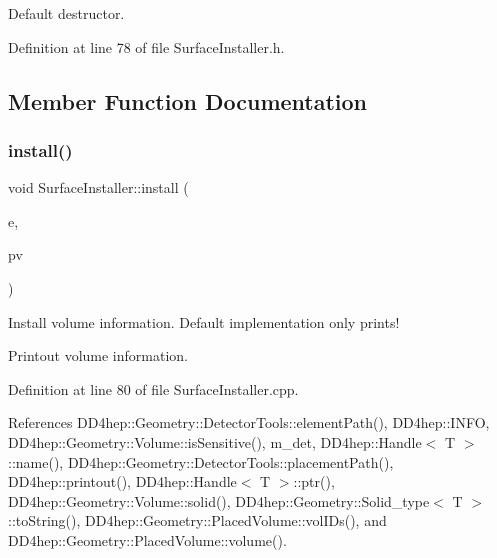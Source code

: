 Default destructor. 



Definition at line 78 of file Surface\+Installer.\+h.



\subsection{Member Function Documentation}
\hypertarget{class_d_d4hep_1_1_surface_installer_a88f2c3a607b0ef1f36ac4f00a28bd21b}{}\label{class_d_d4hep_1_1_surface_installer_a88f2c3a607b0ef1f36ac4f00a28bd21b} 
\subsubsection{\texorpdfstring{install()}{install()}}
{\footnotesize\ttfamily void Surface\+Installer\+::install (\begin{DoxyParamCaption}\item[{\hyperlink{class_d_d4hep_1_1_surface_installer_ab88f41bd9efd54b4b67baee892bfa926}{Det\+Element}}]{e,  }\item[{\hyperlink{class_d_d4hep_1_1_surface_installer_a48fe5565640dc158344c63c2fbb9c506}{Placed\+Volume}}]{pv }\end{DoxyParamCaption})\hspace{0.3cm}{\ttfamily [virtual]}}



Install volume information. Default implementation only prints! 

Printout volume information. 

Definition at line 80 of file Surface\+Installer.\+cpp.



References D\+D4hep\+::\+Geometry\+::\+Detector\+Tools\+::element\+Path(), D\+D4hep\+::\+I\+N\+FO, D\+D4hep\+::\+Geometry\+::\+Volume\+::is\+Sensitive(), m\+\_\+det, D\+D4hep\+::\+Handle$<$ T $>$\+::name(), D\+D4hep\+::\+Geometry\+::\+Detector\+Tools\+::placement\+Path(), D\+D4hep\+::printout(), D\+D4hep\+::\+Handle$<$ T $>$\+::ptr(), D\+D4hep\+::\+Geometry\+::\+Volume\+::solid(), D\+D4hep\+::\+Geometry\+::\+Solid\+\_\+type$<$ T $>$\+::to\+String(), D\+D4hep\+::\+Geometry\+::\+Placed\+Volume\+::vol\+I\+Ds(), and D\+D4hep\+::\+Geometry\+::\+Placed\+Volume\+::volume().




